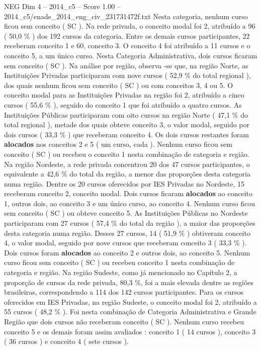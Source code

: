 \begin{textsample}{NEG Dim 4 – 2014\_c5 – Score 1.00 – 2014\_c5/enade\_2014\_eng\_civ\_231731472f.txt}
Nesta categoria, nenhum curso ficou sem conceito ( SC ).
Na rede privada, o conceito modal foi 2, atribuído a 96 ( 50,0 \% ) dos 192 cursos da categoria.
Entre os demais cursos participantes, 22 receberam conceito 1 e 60, conceito 3.
O conceito 4 foi atribuído a 11 cursos e o conceito 5, a um único curso.
Nesta Categoria Administrativa, dois cursos ficaram sem conceito ( SC ).
Na análise por região, observa -se que, na região Norte, as Instituições Privadas participaram com nove cursos ( 52,9 \% do total regional ), dos quais nenhum ficou sem conceito ( SC ) ou com conceitos 3, 4 ou 5.
O conceito modal para as Instituições Privadas na região foi 2, atribuído a cinco cursos ( 55,6 \% ), seguido do conceito 1 que foi atribuído a quatro cursos.
As Instituições Públicas participaram com oito cursos na região Norte ( 47,1 \% do total regional ), metade dos quais obteve conceito 3, o valor modal, seguido por dois cursos ( 33,3 \% ) que receberam conceito 4.
Os dois cursos restantes foram \textbf{alocados} nos conceitos 2 e 5 ( um curso, cada ).
Nenhum curso ficou sem conceito ( SC ) ou recebeu o conceito 1 nesta combinação de categoria e região.
Na região Nordeste, a rede privada concentrou 20 dos 47 cursos participantes, o equivalente a 42,6 \% do total da região, a menor das proporções desta categoria numa região.
Dentre os 20 cursos oferecidos por IES Privadas no Nordeste, 15 receberam conceito 2, conceito modal.
Dois cursos ficaram \textbf{alocados} ao conceito 1, outros dois, ao conceito 3 e um único curso, ao conceito 4.
Nenhum curso ficou sem conceito ( SC ) ou obteve conceito 5.
As Instituições Públicas no Nordeste participaram com 27 cursos ( 57,4 \% do total da região ), a maior das proporções desta categoria numa região.
Desses 27 cursos, 14 ( 51,9 \% ) obtiveram conceito 4, o valor modal, seguido por nove cursos que receberam conceito 3 ( 33,3 \% ).
Dois cursos foram \textbf{alocados} ao conceito 2 e outros dois, ao conceito 5.
Nenhum curso ficou sem conceito ( SC ) ou recebeu conceito 1 nesta combinação de categoria e região.
Na região Sudeste, como já mencionado no Capítulo 2, a proporção de cursos da rede privada, 80,3 \%, foi a mais elevada dentre as regiões brasileiras, correspondendo a 114 dos 142 cursos participantes.
Para os cursos oferecidos em IES Privadas, na região Sudeste, o conceito modal foi 2, atribuído a 55 cursos ( 48,2 \% ).
Foi nesta combinação de Categoria Administrativa e Grande Região que dois cursos não receberam conceito ( SC ).
Nenhum curso recebeu conceito 5 e os demais foram assim avaliados : conceito 1 ( 14 cursos ), conceito 3 ( 36 cursos ) e conceito 4 ( sete cursos ).

\end{textsample}
